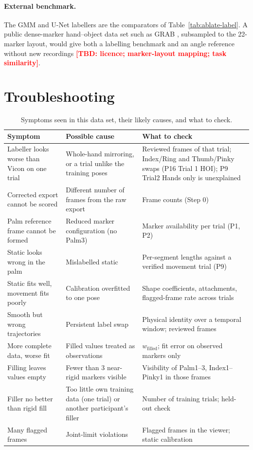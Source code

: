\documentclass[11pt,a4paper]{article}
\newcommand{\tbd}[1]{\textcolor{red}{\textbf{[TBD: #1]}}}
\begin{document}
\paragraph{External benchmark.} The GMM and U-Net labellers are the comparators of Table~\ref{tab:ablate-label}. A public
dense-marker hand--object data set such as GRAB \citep{taheri2020grab}, subsampled to the 22-marker layout, would give
both a labelling benchmark and an angle reference without new recordings
\tbd{licence; marker-layout mapping; task similarity}.

\section{Troubleshooting}\label{sec:trouble}
\begin{table}[h]\centering\small
\caption{Symptoms seen in this data set, their likely causes, and what to check.}\label{tab:trouble}
\begin{tabularx}{\linewidth}{@{}p{3.6cm}p{3.8cm}X@{}}\toprule
Symptom & Possible cause & What to check \\\midrule
Labeller looks worse than Vicon on one trial & Whole-hand mirroring, or a trial unlike the training poses &
Reviewed frames of that trial; Index/Ring and Thumb/Pinky swaps (P16 Trial 1 HOI); P9 Trial2 Hands only is unexplained \\
Corrected export cannot be scored & Different number of frames from the raw export & Frame counts (Step 0) \\
Palm reference frame cannot be formed & Reduced marker configuration (no Palm3) & Marker availability per trial (P1, P2) \\
Static looks wrong in the palm & Mislabelled static & Per-segment lengths against a verified movement trial (P9) \\
Static fits well, movement fits poorly & Calibration overfitted to one pose & Shape coefficients, attachments, flagged-frame rate across trials \\
Smooth but wrong trajectories & Persistent label swap & Physical identity over a temporal window; reviewed frames \\
More complete data, worse fit & Filled values treated as observations & $w_\text{filled}$; fit error on observed markers only \\
Filling leaves values empty & Fewer than 3 near-rigid markers visible & Visibility of Palm1--3, Index1--Pinky1 in those frames \\
Filler no better than rigid fill & Too little own training data (one trial) or another participant's filler & Number of training trials; held-out check \\
Many flagged frames & Joint-limit violations & Flagged frames in the viewer; static calibration \\\bottomrule
\end{tabularx}
\end{table}
\end{document}
